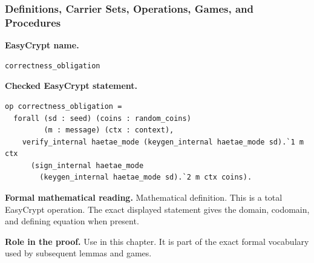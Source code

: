 \subsubsection*{Definitions, Carrier Sets, Operations, Games, and Procedures}
\begin{formaldefinition}
\noindent\textbf{EasyCrypt name.}
\begin{lstlisting}[language=EasyCrypt,basicstyle=\ttfamily\scriptsize]
correctness_obligation
\end{lstlisting}
\noindent\textbf{Checked EasyCrypt statement.}
\begin{lstlisting}[language=EasyCrypt,basicstyle=\ttfamily\scriptsize]
op correctness_obligation =
  forall (sd : seed) (coins : random_coins)
         (m : message) (ctx : context),
    verify_internal haetae_mode (keygen_internal haetae_mode sd).`1 m ctx
      (sign_internal haetae_mode
        (keygen_internal haetae_mode sd).`2 m ctx coins).
\end{lstlisting}
\noindent\textbf{Formal mathematical reading.}
Mathematical definition. This is a total EasyCrypt operation.  The exact displayed statement gives the domain, codomain, and defining equation when present.

\noindent\textbf{Role in the proof.}
Use in this chapter. It is part of the exact formal vocabulary used by subsequent lemmas and games.

\end{formaldefinition}

